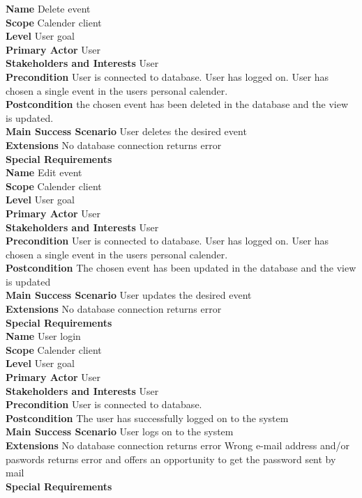 \documentclass[a4paper,10pt,titlepage]{article}
\begin{document}
	\textbf{Name}
	Delete event
	\\
	\textbf{Scope}
	Calender client
	\\
	\textbf{Level}
	User goal
	\\
	\textbf{Primary Actor}
	User
	\\
	\textbf{Stakeholders and Interests}
	User
	\\
	\textbf{Precondition}
	User is connected to database.
	User has logged on.
	User has chosen a single event in the users personal calender.
	\\
	\textbf{Postcondition}
	the chosen event has been deleted in the database and the view is updated.
	\\
	\textbf{Main Success Scenario}
	User deletes the desired event
	\\
	\textbf{Extensions}
	No database connection returns error
	\\
	\textbf{Special Requirements}
	\\
	
	\textbf{Name}
	Edit event
	\\
	\textbf{Scope}
	Calender client
	\\
	\textbf{Level}
	User goal
	\\
	\textbf{Primary Actor}
	User
	\\
	\textbf{Stakeholders and Interests}
	User
	\\
	\textbf{Precondition}
	User is connected to database.
	User has logged on.
	User has chosen a single event in the users personal calender.
	\\
	\textbf{Postcondition}
	The chosen event has been updated in the database and the view is updated
	\\
	\textbf{Main Success Scenario}
	User updates the desired event
	\\
	\textbf{Extensions}
	No database connection returns error
	\\
	\textbf{Special Requirements}
	\\
	
	\textbf{Name}
	User login
	\\
	\textbf{Scope}
	Calender client
	\\
	\textbf{Level}
	User goal
	\\
	\textbf{Primary Actor}
	User
	\\
	\textbf{Stakeholders and Interests}
	User
	\\
	\textbf{Precondition}
	User is connected to database.
	\\
	\textbf{Postcondition}
	The user has successfully logged on to the system
	\\
	\textbf{Main Success Scenario}
	User logs on to the system
	\\
	\textbf{Extensions}
	No database connection returns error
	Wrong e-mail address and/or paswords returns error and offers an opportunity to get the password sent by mail
	\\
	\textbf{Special Requirements}
	\\
	
\end{document}
